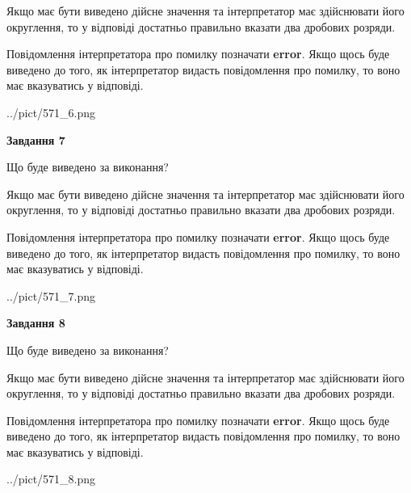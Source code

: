 \documentclass[12pt, ukrainian]{article}
\begin{document}
{\begin {Large}
Якщо має бути виведено дійсне значення та інтерпретатор має здійснювати його округлення, 
то у відповіді достатньо правильно вказати два дробових розряди.

Повідомлення інтерпретатора про помилку позначати \textbf{error}.
Якщо щось буде виведено до того, як інтерпретатор видасть повідомлення про помилку, 
то воно має вказуватись у відповіді. \par

\begin{center}
	{../pict/571_6.png}
\end{center}
\newpage

{\begin {center}\textbf{Завдання 7}\end {center}}\par
Що буде виведено за виконання? \par

Якщо має бути виведено дійсне значення та інтерпретатор має здійснювати його округлення, 
то у відповіді достатньо правильно вказати два дробових розряди.

Повідомлення інтерпретатора про помилку позначати \textbf{error}.
Якщо щось буде виведено до того, як інтерпретатор видасть повідомлення про помилку, 
то воно має вказуватись у відповіді. \par

\begin{center}
	{../pict/571_7.png}
\end{center}
\newpage

{\begin {center}\textbf{Завдання 8}\end {center}}\par
Що буде виведено за виконання? \par

Якщо має бути виведено дійсне значення та інтерпретатор має здійснювати його округлення, 
то у відповіді достатньо правильно вказати два дробових розряди.

Повідомлення інтерпретатора про помилку позначати \textbf{error}.
Якщо щось буде виведено до того, як інтерпретатор видасть повідомлення про помилку, 
то воно має вказуватись у відповіді. \par

\begin{center}
	{../pict/571_8.png}
\end{center}
\newpage


\end{Large}}
\end{document}

